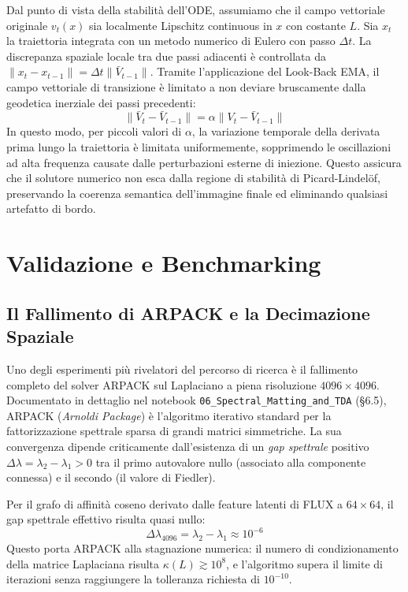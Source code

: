 \documentclass[12pt,a4paper]{report}
\begin{document}
Dal punto di vista della stabilità dell'ODE, assumiamo che il campo vettoriale originale $v_t(x)$ sia localmente Lipschitz continuous in $x$ con costante $L$. Sia $x_{t}$ la traiettoria integrata con un metodo numerico di Eulero con passo $\Delta t$. La discrepanza spaziale locale tra due passi adiacenti è controllata da $\|x_{t} - x_{t-1}\| = \Delta t \| \bar{V}_{t-1} \|$. Tramite l'applicazione del Look-Back EMA, il campo vettoriale di transizione è limitato a non deviare bruscamente dalla geodetica inerziale dei passi precedenti:
\begin{equation}
    \|\bar{V}_t - \bar{V}_{t-1}\| = \alpha \| V_t - \bar{V}_{t-1} \|
\end{equation}
In questo modo, per piccoli valori di $\alpha$, la variazione temporale della derivata prima lungo la traiettoria è limitata uniformemente, sopprimendo le oscillazioni ad alta frequenza causate dalle perturbazioni esterne di iniezione. Questo assicura che il solutore numerico non esca dalla regione di stabilità di Picard-Lindelöf, preservando la coerenza semantica dell'immagine finale ed eliminando qualsiasi artefatto di bordo.

\chapter{Validazione e Benchmarking}

\section{Il Fallimento di ARPACK e la Decimazione Spaziale}

Uno degli esperimenti più rivelatori del percorso di ricerca è il fallimento completo del solver ARPACK sul Laplaciano a piena risoluzione $4096 \times 4096$. Documentato in dettaglio nel notebook \texttt{06\_Spectral\_Matting\_and\_TDA} (\S 6.5), ARPACK (\textit{Arnoldi Package}) è l'algoritmo iterativo standard per la fattorizzazione spettrale sparsa di grandi matrici simmetriche. La sua convergenza dipende criticamente dall'esistenza di un \textit{gap spettrale} positivo $\Delta\lambda = \lambda_2 - \lambda_1 > 0$ tra il primo autovalore nullo (associato alla componente connessa) e il secondo (il valore di Fiedler).

Per il grafo di affinità coseno derivato dalle feature latenti di FLUX a $64 \times 64$, il gap spettrale effettivo risulta quasi nullo:
\begin{equation}
    \Delta\lambda_{4096} = \lambda_2 - \lambda_1 \approx 10^{-6}
\end{equation}
Questo porta ARPACK alla stagnazione numerica: il numero di condizionamento della matrice Laplaciana risulta $\kappa(L) \gtrsim 10^8$, e l'algoritmo supera il limite di iterazioni senza raggiungere la tolleranza richiesta di $10^{-10}$.
\end{document}
